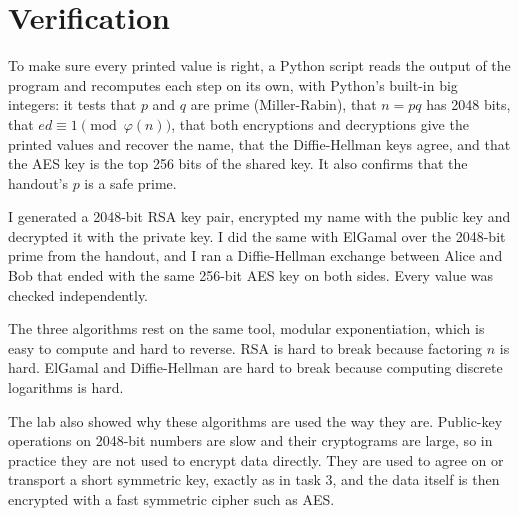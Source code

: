 \documentclass[11pt,a4paper]{article}
\begin{document}
\section{Verification}\label{sec:verify}

To make sure every printed value is right, a Python script reads the output of the program and
recomputes each step on its own, with Python's built-in big integers: it tests that $p$ and $q$
are prime (Miller-Rabin), that $n = pq$ has 2048 bits, that $e d \equiv 1 \pmod{\varphi(n)}$, that
both encryptions and decryptions give the printed values and recover the name, that the
Diffie-Hellman keys agree, and that the AES key is the top 256 bits of the shared key. It also
confirms that the handout's $p$ is a safe prime.





I generated a 2048-bit RSA key pair, encrypted my name with the public key and decrypted it with the
private key. I did the same with ElGamal over the 2048-bit prime from the handout, and I ran a
Diffie-Hellman exchange between Alice and Bob that ended with the same 256-bit AES key on both
sides. Every value was checked independently.

The three algorithms rest on the same tool, modular exponentiation, which is easy to compute and
hard to reverse. RSA is hard to break because factoring $n$ is hard. ElGamal and Diffie-Hellman are
hard to break because computing discrete logarithms is hard.

The lab also showed why these algorithms are used the way they are. Public-key operations on
2048-bit numbers are slow and their cryptograms are large, so in practice they are not used to
encrypt data directly. They are used to agree on or transport a short symmetric key, exactly as in
task 3, and the data itself is then encrypted with a fast symmetric cipher such as AES.
\end{document}
